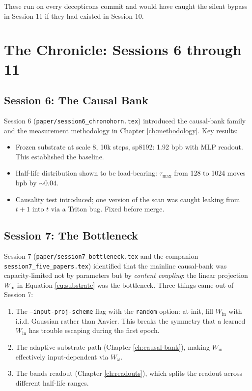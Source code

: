 \documentclass[11pt,openany]{book}
\theoremstyle{definition}
\theoremstyle{plain}
\newcommand{\omegaproj}{W_\omega}
\begin{document}
These run on every decepticons commit and would have caught the silent
bypass in Session 11 if they had existed in Session 10.

\part{The Chronicle: Sessions 6 through 11}

\chapter{Session 6: The Causal Bank}
\label{ch:session6}

Session 6 (\texttt{paper/session6\_chronohorn.tex}) introduced the causal-bank
family and the measurement methodology in Chapter \ref{ch:methodology}.
Key results:
\begin{itemize}
  \item Frozen substrate at scale 8, 10k steps, sp8192: 1.92 bpb with
    MLP readout. This established the baseline.
  \item Half-life distribution shown to be load-bearing: $\tau_{\max}$
    from 128 to 1024 moves bpb by $\sim 0.04$.
  \item Causality test introduced; one version of the scan was caught
    leaking from $t+1$ into $t$ via a Triton bug. Fixed before merge.
\end{itemize}

\chapter{Session 7: The Bottleneck}
\label{ch:session7}

Session 7 (\texttt{paper/session7\_bottleneck.tex} and the companion
\texttt{session7\_five\_papers.tex}) identified that the mainline causal-bank
was capacity-limited not by parameters but by \emph{content coupling}: the
linear projection $W_{\text{in}}$ in Equation \ref{eq:substrate} was the
bottleneck. Three things came out of Session 7:
\begin{enumerate}
  \item The \texttt{--input-proj-scheme} flag with the \texttt{random}
    option: at init, fill $W_{\text{in}}$ with i.i.d. Gaussian rather
    than Xavier. This breaks the symmetry that a learned $W_{\text{in}}$
    has trouble escaping during the first epoch.
  \item The adaptive substrate path (Chapter \ref{ch:causal-bank}),
    making $W_{\text{in}}$ effectively input-dependent via $\omegaproj$.
  \item The bands readout (Chapter \ref{ch:readouts}), which splits the
    readout across different half-life ranges.
\end{enumerate}
\end{document}
